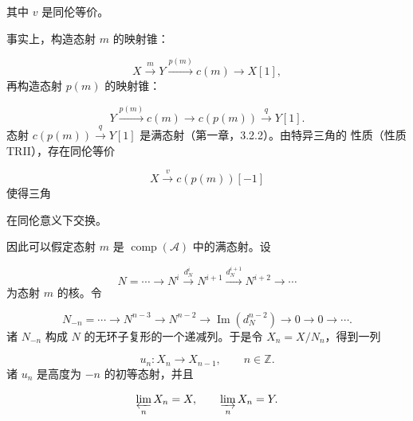 \clearpage
{}%
\begingroup\small\setlength{\parskip}{0pt}\setlength{\emergencystretch}{1.5em}
\setlength{\abovedisplayskip}{4pt plus 2pt minus 2pt}%
\setlength{\belowdisplayskip}{4pt plus 2pt minus 2pt}%

其中 $v$ 是同伦等价。

事实上，构造态射 $m$ 的映射锥：

\[
X\xrightarrow{m}Y\xrightarrow{p(m)}c(m)\longrightarrow X[1],
\]
再构造态射 $p(m)$ 的映射锥：

\[
Y\xrightarrow{p(m)}c(m)\longrightarrow c(p(m))
\xrightarrow{q}Y[1].
\]
态射 $c(p(m))\xrightarrow{q}Y[1]$ 是满态射（第一章，3.2.2）。由特异三角的
性质（性质 TRII），存在同伦等价

\[
X\xrightarrow{v}c(p(m))[-1]
\]
使得三角

\begin{center}
\end{center}
在同伦意义下交换。

因此可以假定态射 $m$ 是 $\operatorname{comp}(\mathcal A)$ 中的满态射。设

\[
N=\cdots\longrightarrow N^i\xrightarrow{d_N^i}N^{i+1}
\xrightarrow{d_N^{i+1}}N^{i+2}\longrightarrow\cdots
\]
为态射 $m$ 的核。令

\[
N_{-n}=\cdots\longrightarrow N^{n-3}\longrightarrow N^{n-2}
\longrightarrow\operatorname{Im}(d_N^{n-2})
\longrightarrow0\longrightarrow0\longrightarrow\cdots.
\]
诸 $N_{-n}$ 构成 $N$ 的无环子复形的一个递减列。于是令
$X_n=X/N_n$，得到一列

\[
u_n\colon X_n\longrightarrow X_{n-1},\qquad n\in\mathbb Z.
\]
诸 $u_n$ 是高度为 $-n$ 的初等态射，并且

\[
\varprojlim_n X_n=X,
\qquad
\varinjlim_n X_n=Y.
\]
\endgroup
